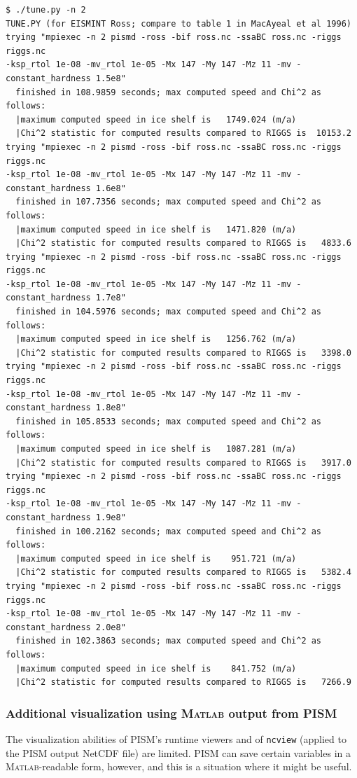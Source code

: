 \documentclass[11pt,final]{amsart}
\newcommand{\Matlab}{\textsc{Matlab}\xspace}
\begin{document}
\small\begin{verbatim}
$ ./tune.py -n 2
TUNE.PY (for EISMINT Ross; compare to table 1 in MacAyeal et al 1996)
trying "mpiexec -n 2 pismd -ross -bif ross.nc -ssaBC ross.nc -riggs riggs.nc 
-ksp_rtol 1e-08 -mv_rtol 1e-05 -Mx 147 -My 147 -Mz 11 -mv -constant_hardness 1.5e8"
  finished in 108.9859 seconds; max computed speed and Chi^2 as follows:
  |maximum computed speed in ice shelf is   1749.024 (m/a)
  |Chi^2 statistic for computed results compared to RIGGS is  10153.2
trying "mpiexec -n 2 pismd -ross -bif ross.nc -ssaBC ross.nc -riggs riggs.nc 
-ksp_rtol 1e-08 -mv_rtol 1e-05 -Mx 147 -My 147 -Mz 11 -mv -constant_hardness 1.6e8"
  finished in 107.7356 seconds; max computed speed and Chi^2 as follows:
  |maximum computed speed in ice shelf is   1471.820 (m/a)
  |Chi^2 statistic for computed results compared to RIGGS is   4833.6
trying "mpiexec -n 2 pismd -ross -bif ross.nc -ssaBC ross.nc -riggs riggs.nc 
-ksp_rtol 1e-08 -mv_rtol 1e-05 -Mx 147 -My 147 -Mz 11 -mv -constant_hardness 1.7e8"
  finished in 104.5976 seconds; max computed speed and Chi^2 as follows:
  |maximum computed speed in ice shelf is   1256.762 (m/a)
  |Chi^2 statistic for computed results compared to RIGGS is   3398.0
trying "mpiexec -n 2 pismd -ross -bif ross.nc -ssaBC ross.nc -riggs riggs.nc 
-ksp_rtol 1e-08 -mv_rtol 1e-05 -Mx 147 -My 147 -Mz 11 -mv -constant_hardness 1.8e8"
  finished in 105.8533 seconds; max computed speed and Chi^2 as follows:
  |maximum computed speed in ice shelf is   1087.281 (m/a)
  |Chi^2 statistic for computed results compared to RIGGS is   3917.0
trying "mpiexec -n 2 pismd -ross -bif ross.nc -ssaBC ross.nc -riggs riggs.nc 
-ksp_rtol 1e-08 -mv_rtol 1e-05 -Mx 147 -My 147 -Mz 11 -mv -constant_hardness 1.9e8"
  finished in 100.2162 seconds; max computed speed and Chi^2 as follows:
  |maximum computed speed in ice shelf is    951.721 (m/a)
  |Chi^2 statistic for computed results compared to RIGGS is   5382.4
trying "mpiexec -n 2 pismd -ross -bif ross.nc -ssaBC ross.nc -riggs riggs.nc 
-ksp_rtol 1e-08 -mv_rtol 1e-05 -Mx 147 -My 147 -Mz 11 -mv -constant_hardness 2.0e8"
  finished in 102.3863 seconds; max computed speed and Chi^2 as follows:
  |maximum computed speed in ice shelf is    841.752 (m/a)
  |Chi^2 statistic for computed results compared to RIGGS is   7266.9
\end{verbatim}
\normalsize

\subsubsection{Additional visualization using \Matlab output from PISM}  The visualization abilities of PISM's runtime viewers and of \verb|ncview| (applied to the PISM output NetCDF file) are limited.  PISM can save certain variables in a \Matlab-readable form, however, and this is a situation where it might be useful.
\end{document}
